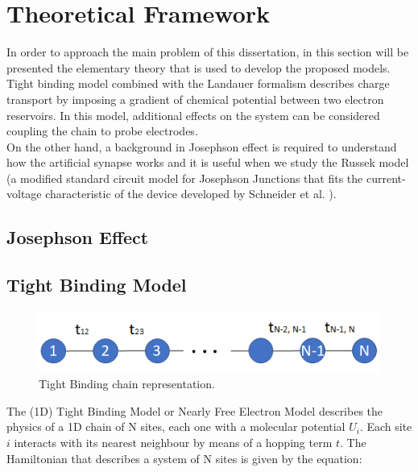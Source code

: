 \documentclass[12pt]{article}
\begin{document}
\clearpage
\newpage
\section{Theoretical Framework}

 In order to approach the main problem of this dissertation, in this section will be presented the elementary theory that is used to develop the proposed models. Tight binding model combined with the Landauer formalism describes charge transport by imposing a gradient of chemical potential between two electron reservoirs. In this model, additional effects on the system can be considered coupling the chain to probe electrodes. \\
 
 On the other hand, a background in Josephson effect is required to understand how the artificial synapse works and it is useful when we study the Russek model \cite{RUSSEK} (a modified standard circuit model for Josephson Junctions that fits the current-voltage characteristic of the device developed by Schneider et al. \cite{MAINREF}).  

\clearpage
\newpage
\subsection{Josephson Effect}




\clearpage
\newpage
\subsection{Tight Binding Model}

\begin{figure}[ht]
    \centering
    \includegraphics[scale=0.7]{TightBindingChain.png}
    \caption{Tight Binding chain representation.}
    \label{Chain}
\end{figure}

 The (1D) Tight Binding Model or Nearly Free Electron Model describes the physics of a 1D chain of N sites, each one with a molecular potential $U_{i}$. Each site $i$ interacts with its nearest neighbour by means of a hopping term $t$. The Hamiltonian that describes a system of N sites is given by the equation:
 
\end{document}
